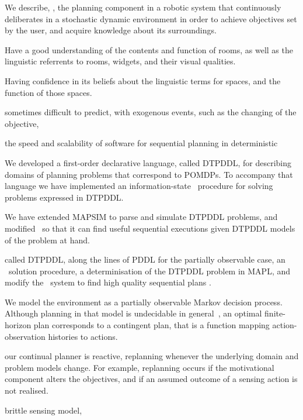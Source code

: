 



We describe, \pcogx, the planning component in a robotic system that
continuously deliberates in a stochastic dynamic environment in order
to achieve objectives set by the user, and acquire knowledge about its
surroundings.

Have a good understanding of the contents and function of rooms, as
well as the linguistic referrents to rooms, widgets, and their visual
qualities.

Having confidence in its beliefs about the linguistic terms for
spaces, and the function of those spaces.



sometimes difficult to predict, with exogenous events, such as the
changing of the objective, 





the speed and scalability of software for sequential planning in
deterministic




We developed a first-order declarative language, called DTPDDL, for
describing domains of planning problems that correspond to POMDPs.  To
accompany that language we have implemented an information-state
\laostar\ procedure for solving problems expressed in DTPDDL. 

We have extended MAPSIM to parse and simulate DTPDDL problems, and
modified \fastdownward\ so that it can find useful sequential executions
given DTPDDL models of the problem at hand.




 called DTPDDL, along
the lines of PDDL for the partially observable case, an \laostar\
solution procedure, a determinisation of the DTPDDL problem in MAPL,
and modify the \fastdownward\ system to find high quality sequential plans
.

We model the environment as a partially observable Markov decision
process. Although planning in that model is undecidable in
general~\cite{}, an optimal finite-horizon plan corresponds to a
contingent plan, that is a function mapping action-observation
histories to actions.

our continual planner is reactive, replanning whenever the underlying
domain and problem models change. For example, replanning occurs if
the motivational component alters the objectives, and if an assumed
outcome of a sensing action is not realised.

brittle sensing model, 

